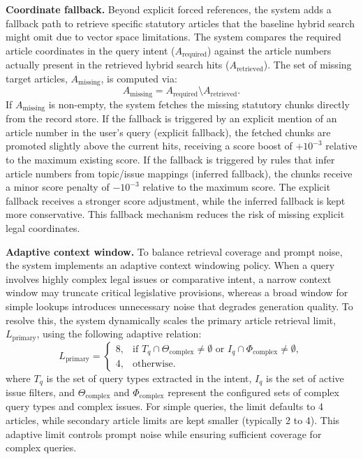 \textbf{Coordinate fallback.} Beyond explicit forced references, the system adds a fallback path to retrieve specific statutory articles that the baseline hybrid search might omit due to vector space limitations. The system compares the required article coordinates in the query intent ($A_{\mathrm{required}}$) against the article numbers actually present in the retrieved hybrid search hits ($A_{\mathrm{retrieved}}$). The set of missing target articles, $A_{\mathrm{missing}}$, is computed via:
\[
A_{\mathrm{missing}} =
A_{\mathrm{required}} \setminus A_{\mathrm{retrieved}}.
\]
If $A_{\mathrm{missing}}$ is non-empty, the system fetches the missing statutory chunks directly from the record store. If the fallback is triggered by an explicit mention of an article number in the user's query (explicit fallback), the fetched chunks are promoted slightly above the current hits, receiving a score boost of $+10^{-3}$ relative to the maximum existing score. If the fallback is triggered by rules that infer article numbers from topic/issue mappings (inferred fallback), the chunks receive a minor score penalty of $-10^{-3}$ relative to the maximum score. The explicit fallback receives a stronger score adjustment, while the inferred fallback is kept more conservative. This fallback mechanism reduces the risk of missing explicit legal coordinates.

\textbf{Adaptive context window.} To balance retrieval coverage and prompt noise, the system implements an adaptive context windowing policy. When a query involves highly complex legal issues or comparative intent, a narrow context window may truncate critical legislative provisions, whereas a broad window for simple lookups introduces unnecessary noise that degrades generation quality. To resolve this, the system dynamically scales the primary article retrieval limit, $L_{\mathrm{primary}}$, using the following adaptive relation:
\[
L_{\mathrm{primary}} =
\begin{cases}
8, & \text{if } T_q \cap \Theta_{\mathrm{complex}} \neq \emptyset
      \text{ or } I_q \cap \Phi_{\mathrm{complex}} \neq \emptyset,\\
4, & \text{otherwise.}
\end{cases}
\]
where $T_q$ is the set of query types extracted in the intent, $I_q$ is the set of active issue filters, and $\Theta_{\mathrm{complex}}$ and $\Phi_{\mathrm{complex}}$ represent the configured sets of complex query types and complex issues. For simple queries, the limit defaults to 4 articles, while secondary article limits are kept smaller (typically 2 to 4). This adaptive limit controls prompt noise while ensuring sufficient coverage for complex queries.

